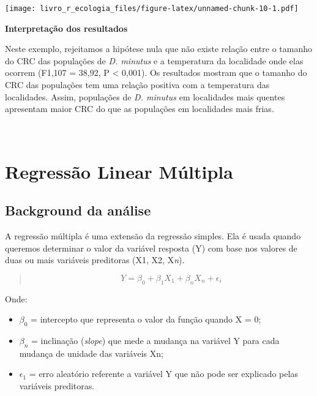 \documentclass[
]{book}
\begin{document}
\texttt{[image: livro\_r\_ecologia\_files/figure-latex/unnamed-chunk-10-1.pdf]}

\textbf{Interpretação dos resultados}

Neste exemplo, rejeitamos a hipótese nula que não existe relação entre o tamanho do CRC das populações de \emph{D. minutus} e a temperatura da localidade onde elas ocorrem (F1,107 = 38,92, P \textless{} 0,001). Os resultados mostram que o tamanho do CRC das populações tem uma relação positiva com a temperatura das localidades. Assim, populações de \emph{D. minutus} em localidades mais quentes apresentam maior CRC do que as populações em localidades mais frias.

~

\hypertarget{regressuxe3o-linear-muxfaltipla}{%
\section{Regressão Linear Múltipla}\label{regressuxe3o-linear-muxfaltipla}}

\hypertarget{background-da-anuxe1lise-4}{%
\subsection{Background da análise}\label{background-da-anuxe1lise-4}}

A regressão múltipla é uma extensão da regressão simples. Ela é usada quando queremos determinar o valor da variável resposta (Y) com base nos valores de duas ou mais variáveis preditoras (X1, X2, X\emph{n}).

\begin{quote}
\[ Y = \beta_0 + \beta_{1}X_1 + \beta_{n}X_n + \epsilon_i \]
\end{quote}

Onde:

\begin{itemize}
\item
  \(\beta_0\) = intercepto que representa o valor da função quando X = 0;
\item
  \(\beta_{n}\) = inclinação (\emph{slope}) que mede a mudança na variável Y para cada mudança de unidade das variáveis Xn;
\item
  \(\epsilon_{1}\) = erro aleatório referente a variável Y que não pode ser explicado pelas variáveis preditoras.
\end{itemize}
\end{document}
